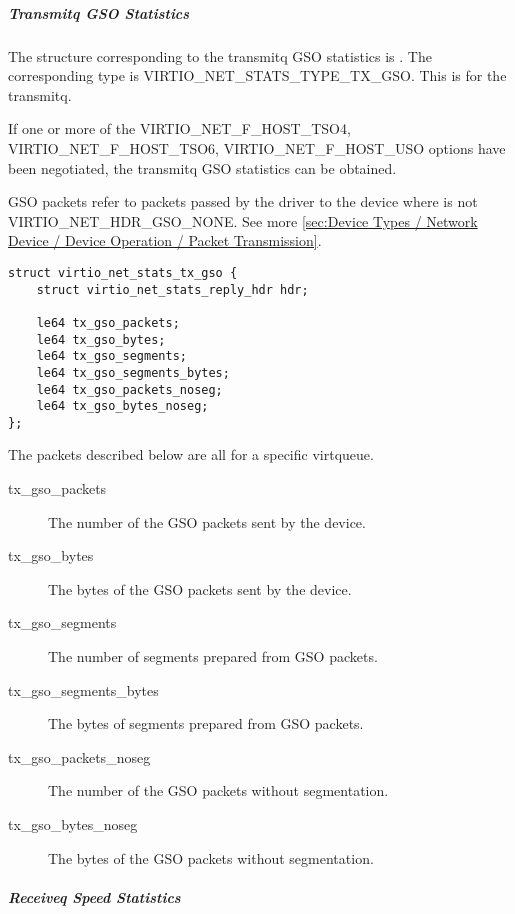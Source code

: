 \subparagraph{Transmitq GSO Statistics}\label{sec:Device Types / Network Device / Device Operation / Control Virtqueue / Device Statistics / Transmitq GSO Statistics}

The structure corresponding to the transmitq GSO statistics is
. The corresponding type is
VIRTIO_NET_STATS_TYPE_TX_GSO. This is for the transmitq.

If one or more of the VIRTIO_NET_F_HOST_TSO4, VIRTIO_NET_F_HOST_TSO6,
VIRTIO_NET_F_HOST_USO options have been negotiated, the transmitq GSO statistics
can be obtained.

GSO packets refer to packets passed by the driver to the device where
 is not VIRTIO_NET_HDR_GSO_NONE.
See more \ref{sec:Device Types / Network Device / Device Operation / Packet
Transmission}.

\begin{lstlisting}
struct virtio_net_stats_tx_gso {
    struct virtio_net_stats_reply_hdr hdr;

    le64 tx_gso_packets;
    le64 tx_gso_bytes;
    le64 tx_gso_segments;
    le64 tx_gso_segments_bytes;
    le64 tx_gso_packets_noseg;
    le64 tx_gso_bytes_noseg;
};
\end{lstlisting}

The packets described below are all for a specific virtqueue.
\begin{description}
    \item [tx_gso_packets]
        The number of the GSO packets sent by the device.

    \item [tx_gso_bytes]
        The bytes of the GSO packets sent by the device.

    \item [tx_gso_segments]
        The number of segments prepared from GSO packets.

    \item [tx_gso_segments_bytes]
        The bytes of segments prepared from GSO packets.

    \item [tx_gso_packets_noseg]
        The number of the GSO packets without segmentation.

    \item [tx_gso_bytes_noseg]
        The bytes of the GSO packets without segmentation.

\end{description}

\subparagraph{Receiveq Speed Statistics}\label{sec:Device Types / Network Device / Device Operation / Control Virtqueue / Device Statistics / Receiveq Speed Statistics}

